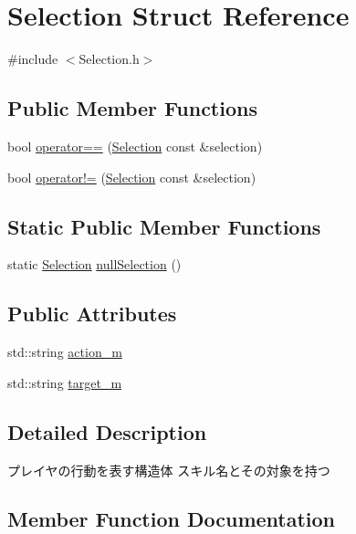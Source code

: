 \hypertarget{struct_selection}{}\section{Selection Struct Reference}
\label{struct_selection}


{\ttfamily \#include $<$Selection.\+h$>$}

\subsection*{Public Member Functions}
\begin{DoxyCompactItemize}
\item 
bool \hyperlink{struct_selection_a2507ddef6e1ca58ce2446e78bffac79f}{operator==} (\hyperlink{struct_selection}{Selection} const \&selection)
\item 
bool \hyperlink{struct_selection_af73a38260e75de68b3648e8b1fd63adb}{operator!=} (\hyperlink{struct_selection}{Selection} const \&selection)
\end{DoxyCompactItemize}
\subsection*{Static Public Member Functions}
\begin{DoxyCompactItemize}
\item 
static \hyperlink{struct_selection}{Selection} \hyperlink{struct_selection_ac6354c46eb8f69fe42f8dabcecd9ab41}{null\+Selection} ()
\end{DoxyCompactItemize}
\subsection*{Public Attributes}
\begin{DoxyCompactItemize}
\item 
std\+::string \hyperlink{struct_selection_afa2a96c53dda82f7bd1c8a090bdc254e}{action\+\_\+m}
\item 
std\+::string \hyperlink{struct_selection_a1b21fefdc3fa3795f1c0a4701e9f8ee9}{target\+\_\+m}
\end{DoxyCompactItemize}


\subsection{Detailed Description}
プレイヤの行動を表す構造体 スキル名とその対象を持つ 

\subsection{Member Function Documentation}
\hypertarget{struct_selection_ac6354c46eb8f69fe42f8dabcecd9ab41}{}
